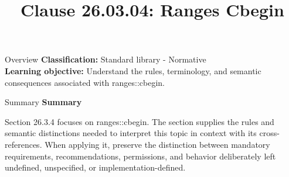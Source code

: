 \documentclass[10pt,letterpaper]{article}
\title{Clause 26.03.04: Ranges Cbegin}
\author{}
\date{}
\begin{document}
\maketitle
\begin{CornellOverviewBox}{Overview}
\textbf{Classification:} Standard library - Normative\\[2pt]
\textbf{Learning objective:} Understand the rules, terminology, and semantic consequences associated with ranges::cbegin.
\end{CornellOverviewBox}\begin{CornellSummaryBox}{Summary}
{\sffamily\bfseries\color{Accent} Summary}\par\vspace{3pt}Section 26.3.4 focuses on ranges::cbegin. The section supplies the rules and semantic distinctions needed to interpret this topic in context with its cross-references. When applying it, preserve the distinction between mandatory requirements, recommendations, permissions, and behavior deliberately left undefined, unspecified, or implementation-defined.
\end{CornellSummaryBox}
\end{document}
